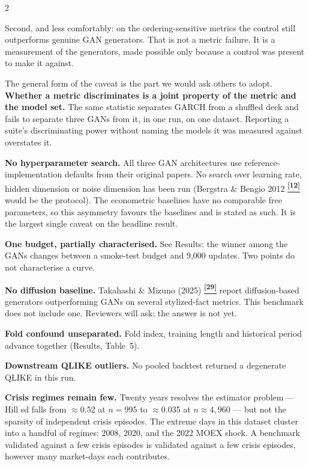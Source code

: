 \documentclass[10pt]{article}
\newcommand{\redbox}[2]{\begin{tcolorbox}[mybox={DRed}{RBg},title={#1}]#2\end{tcolorbox}}
\newcommand{\tcite}[1]{%
  \hyperlink{R:#1}{\textsuperscript{\scriptsize\textbf{[#1]}}}}
\begin{document}
\begin{multicols}{2}
{Second, and less comfortably: on the ordering-sensitive metrics the control still outperforms genuine GAN generators. That is not a metric failure. It is a measurement of the generators, made possible only because a control was present to make it against.

\smallskip
The general form of the caveat is the part we would ask others to adopt. \textbf{Whether a metric discriminates is a joint property of the metric and the model set.} The same statistic separates GARCH from a shuffled deck and fails to separate three GANs from it, in one run, on one dataset. Reporting a suite's discriminating power without naming the models it was measured against overstates it.}

\columnbreak

\redbox{Limitations}{%
\textbf{No hyperparameter search.} All three GAN architectures use reference-implementation defaults from their original papers. No search over learning rate, hidden dimension or noise dimension has been run (Bergstra \& Bengio 2012\tcite{12} would be the protocol). The econometric baselines have no comparable free parameters, so this asymmetry favours the baselines and is stated as such. It is the largest single caveat on the headline result.

\textbf{One budget, partially characterised.} See Results: the winner among the GANs changes between a smoke-test budget and 9,000 updates. Two points do not characterise a curve.

\textbf{No diffusion baseline.} Takahashi \& Mizuno (2025)\tcite{29} report diffusion-based generators outperforming GANs on several stylized-fact metrics. This benchmark does not include one. Reviewers will ask; the answer is not yet.

\textbf{Fold confound unseparated.} Fold index, training length and historical period advance together (Results, Table~5).

\textbf{Downstream QLIKE outliers.} No pooled backtest returned a degenerate QLIKE in this run.

\textbf{Crisis regimes remain few.} Twenty years resolves the estimator problem --- Hill sd falls from $\approx$0.52 at $n=995$ to $\approx$0.035 at $n\approx4{,}960$ --- but not the sparsity of independent crisis episodes. The extreme days in this dataset cluster into a handful of regimes: 2008, 2020, and the 2022 MOEX shock. A benchmark validated against a few crisis episodes is validated against a few crisis episodes, however many market-days each contributes.

}
\end{multicols}
\end{document}
